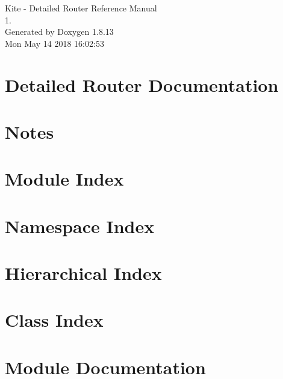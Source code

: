 \documentclass[a4paper]{asimbook}
\begin{document}
   \begin{titlepage}
     \vspace*{7cm}
     \begin{center}
     {\Large Kite -\/ Detailed Router Reference Manual\\[1ex]\large 1. }\\
     \vspace*{1cm}
     {\large Generated by Doxygen 1.8.13}\\
     \vspace*{0.5cm}
     {\small Mon May 14 2018 16:02:53}\\
     \end{center}
   \end{titlepage}

   \clearemptydoublepage

   \tableofcontents
   \clearemptydoublepage

\section{Detailed Router Documentation}
\label{index}\hypertarget{index}{}
\section{Notes}
\label{pageNotes}

\section{Module Index}

\section{Namespace Index}

\section{Hierarchical Index}

\section{Class Index}

\section{Module Documentation}


\end{document}
